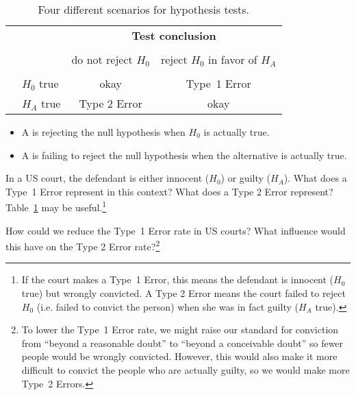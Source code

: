 \begin{table}[ht]
\centering
\begin{tabular}{l l c c}
& & \multicolumn{2}{c}{\textbf{Test conclusion}} \\
  \cline{3-4}
\vspace{-3.7mm} \\
& & do not reject $H_0$ &  reject $H_0$ in favor of $H_A$ \\
  \cline{2-4}
\vspace{-3.7mm} \\
& $H_0$ true & okay &  Type~1 Error \\
\raisebox{1.5ex}{\textbf{Truth}} & $H_A$ true & Type 2 Error & okay \\
  \cline{2-4}
\end{tabular}
\caption{Four different scenarios for hypothesis tests.}
\label{fourHTScenarios}
\end{table}

\begin{termBox}{
\begin{itemize}
\item A  is rejecting the null hypothesis when $H_0$ is actually true. 
\item A  is failing to reject the null hypothesis when the alternative is actually true.
\end{itemize}
}
\end{termBox}

\begin{exercise} \label{whatAreTheErrorTypesInUSCourts}
In a US court, the defendant is either innocent ($H_0$) or  guilty ($H_A$). What does a Type~1 Error represent in this context? What does a Type 2 Error represent? Table~\ref{fourHTScenarios} may be useful.\footnote{If the court makes a Type~1 Error, this means the defendant is innocent ($H_0$ true) but wrongly convicted. A Type 2 Error means the court failed to reject $H_0$ (i.e. failed to convict the person) when she was in fact guilty ($H_A$ true).}
\end{exercise}

\begin{exercise} \label{howToReduceType1ErrorsInUSCourts}
How could we reduce the Type~1 Error rate in US courts? What influence would this have on the Type 2 Error rate?\footnote{To lower the Type~1 Error rate, we might raise our standard for conviction from ``beyond a reasonable doubt'' to ``beyond a conceivable doubt'' so fewer people would be wrongly convicted. However, this would also make it more difficult to convict the people who are actually guilty, so we would make more Type~2 Errors.}
\end{exercise}

